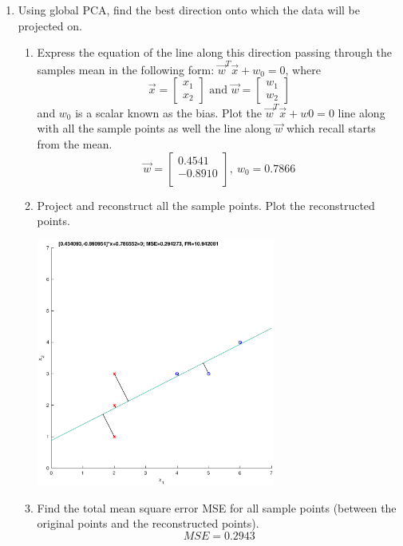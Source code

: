 \documentclass[letterpaper,10pt]{article}
\begin{document}
\begin{enumerate}
\item Using global PCA, find the best direction onto which the data will be projected on.\\

\begin{enumerate}
	\item Express the equation of the line along this direction passing	through the samples mean in the following form: $\vec{w}^T\vec{x} + w_0 = 0$, where
	$$\vec{x}=\left[\begin{array}{c}
	x_1 \\ x_2
	\end{array}\right]\text{~and~}\vec{w}=\left[\begin{array}{c}
	w_1 \\ w_2
	\end{array}\right]$$
	and $w_0$ is a scalar known as the bias. Plot the $\vec{w}^T\vec{x} + w0 = 0$ line
	along with all the sample points as well the line along $\vec{w}$ which recall starts from the mean.
	$$\vec{w}=\left[\begin{array}{c}
	 0.4541 \\
	 -0.8910 \\
	\end{array}\right],~w_0=0.7866$$
	
	\item Project and reconstruct all the sample points. Plot the reconstructed points.
	\begin{center}
	\includegraphics[width=0.65\textwidth]{./matlab/PCA.eps}
	\end{center}
	
	
	\item Find the total mean square error MSE for all sample points (between the original points and the reconstructed points).
	$$MSE=0.2943$$
	

\end{enumerate}
\end{enumerate}
\end{document}
